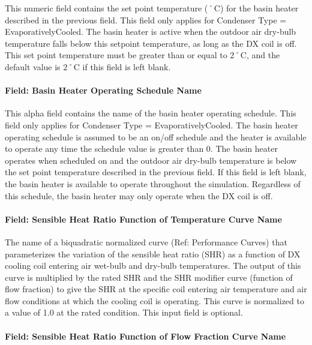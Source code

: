 This numeric field contains the set point temperature (˚C) for the basin heater described in the previous field. This field only applies for Condenser Type = EvaporativelyCooled. The basin heater is active when the outdoor air dry-bulb temperature falls below this setpoint temperature, as long as the DX coil is off. This set point temperature must be greater than or equal to 2˚C, and the default value is 2˚C if this field is left blank.

\paragraph{Field: Basin Heater Operating Schedule Name}\label{field-basin-heater-operating-schedule-name-1-000}

This alpha field contains the name of the basin heater operating schedule. This field only applies for Condenser Type = EvaporativelyCooled. The basin heater operating schedule is assumed to be an on/off schedule and the heater is available to operate any time the schedule value is greater than 0. The basin heater operates when scheduled on and the outdoor air dry-bulb temperature is below the set point temperature described in the previous field. If this field is left blank, the basin heater is available to operate throughout the simulation. Regardless of this schedule, the basin heater may only operate when the DX coil is off.

\paragraph{Field: Sensible Heat Ratio Function of Temperature Curve Name}\label{field-sensible-heat-ratio-function-of-temperature-curve-name-1}

The name of a biquadratic normalized curve (Ref: Performance Curves) that parameterizes the variation of the sensible heat ratio (SHR) as a function of DX cooling coil entering air wet-bulb and dry-bulb temperatures. The output of this curve is multiplied by the rated SHR and the SHR modifier curve (function of flow fraction) to give the SHR at the specific coil entering air temperature and air flow conditions at which the cooling coil is operating. This curve is normalized to a value of 1.0 at the rated condition. This input field is optional.

\paragraph{Field: Sensible Heat Ratio Function of Flow Fraction Curve Name}\label{field-sensible-heat-ratio-function-of-flow-fraction-curve-name-1}

